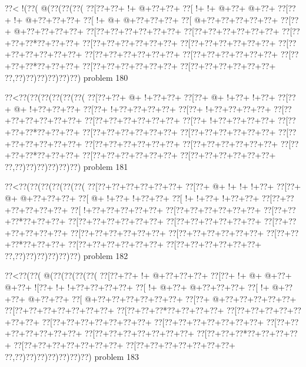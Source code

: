 \vbox{\vbox{\goo
\0??<\- !(\0??(\- @(\0??(\0??(\0??(
\0??[\0??+\0??+\- !+\- @+\0??+\0??+
\0??[\- !+\- !+\- @+\0??+\- @+\0??+
\0??[\0??+\- !+\- @+\0??+\0??+\0??+
\0??[\- !+\- @+\- @+\0??+\0??+\0??+
\0??[\- @+\0??+\0??+\0??+\0??+\0??+
\0??[\0??+\- @+\0??+\0??+\0??+\0??+
\0??[\0??+\0??+\0??+\0??+\0??+\0??+
\0??[\0??+\0??+\0??+\0??+\0??+\0??+
\0??[\0??+\0??+\0??*\0??+\0??+\0??+
\0??[\0??+\0??+\0??+\0??+\0??+\0??+
\0??[\0??+\0??+\0??+\0??+\0??+\0??+
\0??[\0??+\0??+\0??+\0??+\0??+\0??+
\0??[\0??+\0??+\0??+\0??+\0??+\0??+
\0??[\0??+\0??+\0??+\0??+\0??+\0??+
\0??[\0??+\0??+\0??*\0??+\0??+\0??+
\0??[\0??+\0??+\0??+\0??+\0??+\0??+
\0??[\0??+\0??+\0??+\0??+\0??+\0??+
\0??,\0??)\0??)\0??)\0??)\0??)\0??)
}
\hfil problem 180\hfil\break
}

\vbox{\vbox{\goo
\0??<\0??(\0??(\0??(\0??(\0??(\0??(
\0??[\0??+\0??+\- @+\- !+\0??+\0??+
\0??[\0??+\- @+\- !+\0??+\- !+\0??+
\0??[\0??+\- @+\- !+\0??+\0??+\0??+
\0??[\0??+\- !+\0??+\0??+\0??+\0??+
\0??[\0??+\- !+\0??+\0??+\0??+\0??+
\0??[\0??+\0??+\0??+\0??+\0??+\0??+
\0??[\0??+\0??+\0??+\0??+\0??+\0??+
\0??[\0??+\- !+\0??+\0??+\0??+\0??+
\0??[\0??+\0??+\0??*\0??+\0??+\0??+
\0??[\0??+\0??+\0??+\0??+\0??+\0??+
\0??[\0??+\0??+\0??+\0??+\0??+\0??+
\0??[\0??+\0??+\0??+\0??+\0??+\0??+
\0??[\0??+\0??+\0??+\0??+\0??+\0??+
\0??[\0??+\0??+\0??+\0??+\0??+\0??+
\0??[\0??+\0??+\0??*\0??+\0??+\0??+
\0??[\0??+\0??+\0??+\0??+\0??+\0??+
\0??[\0??+\0??+\0??+\0??+\0??+\0??+
\0??,\0??)\0??)\0??)\0??)\0??)\0??)
}
\hfil problem 181\hfil\break
}

\vbox{\vbox{\goo
\0??<\0??(\0??(\0??(\0??(\0??(\0??(
\0??[\0??+\0??+\0??+\0??+\0??+\0??+
\0??[\0??+\- @+\- !+\- !+\- !+\0??+
\0??[\0??+\- @+\- @+\0??+\0??+\0??+
\0??[\- @+\- !+\0??+\- !+\0??+\0??+
\0??[\- !+\- !+\0??+\- !+\0??+\0??+
\0??[\0??+\0??+\0??+\0??+\0??+\0??+
\0??[\- !+\0??+\0??+\0??+\0??+\0??+
\0??[\0??+\0??+\0??+\0??+\0??+\0??+
\0??[\0??+\0??+\0??*\0??+\0??+\0??+
\0??[\0??+\0??+\0??+\0??+\0??+\0??+
\0??[\0??+\0??+\0??+\0??+\0??+\0??+
\0??[\0??+\0??+\0??+\0??+\0??+\0??+
\0??[\0??+\0??+\0??+\0??+\0??+\0??+
\0??[\0??+\0??+\0??+\0??+\0??+\0??+
\0??[\0??+\0??+\0??*\0??+\0??+\0??+
\0??[\0??+\0??+\0??+\0??+\0??+\0??+
\0??[\0??+\0??+\0??+\0??+\0??+\0??+
\0??,\0??)\0??)\0??)\0??)\0??)\0??)
}
\hfil problem 182\hfil\break
}

\vbox{\vbox{\goo
\0??<\0??(\0??(\- @(\0??(\0??(\0??(\0??(
\0??[\0??+\0??+\- !+\- @+\0??+\0??+\0??+
\0??[\0??+\- !+\- @+\- @+\0??+\- @+\0??+
\- ![\0??+\- !+\- !+\0??+\0??+\0??+\0??+
\0??[\- !+\- @+\0??+\- @+\0??+\0??+\0??+
\0??[\- !+\- @+\0??+\0??+\- @+\0??+\0??+
\0??[\- @+\0??+\0??+\0??+\0??+\0??+\0??+
\0??[\0??+\- @+\0??+\0??+\0??+\0??+\0??+
\0??[\0??+\0??+\0??+\0??+\0??+\0??+\0??+
\0??[\0??+\0??+\0??*\0??+\0??+\0??+\0??+
\0??[\0??+\0??+\0??+\0??+\0??+\0??+\0??+
\0??[\0??+\0??+\0??+\0??+\0??+\0??+\0??+
\0??[\0??+\0??+\0??+\0??+\0??+\0??+\0??+
\0??[\0??+\0??+\0??+\0??+\0??+\0??+\0??+
\0??[\0??+\0??+\0??+\0??+\0??+\0??+\0??+
\0??[\0??+\0??+\0??*\0??+\0??+\0??+\0??+
\0??[\0??+\0??+\0??+\0??+\0??+\0??+\0??+
\0??[\0??+\0??+\0??+\0??+\0??+\0??+\0??+
\0??,\0??)\0??)\0??)\0??)\0??)\0??)\0??)
}
\hfil problem 183\hfil\break
}

